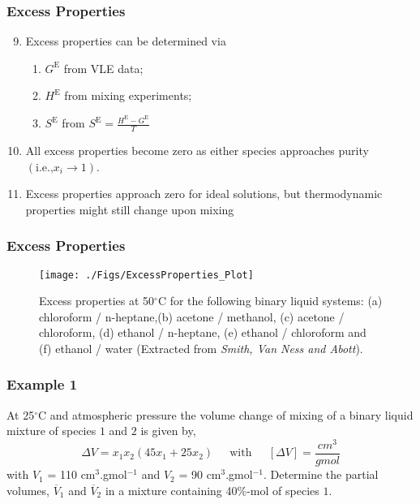 \documentclass[10pt,compress,handout,ignorenonframetext,unknownkeysallowed]{beamer}
\newcommand{\frc}{\displaystyle\frac}
\begin{document}
\begin{frame}
  \frametitle{Excess Properties}
  \begin{enumerate}\setcounter{enumi}{8}
      \item<1-> Excess properties can be determined via
         \begin{enumerate}
            \item<1-> $G^{\text{E}}$ from VLE data;
            \item<1-> $H^{\text{E}}$ from mixing experiments;
            \item<1-> $S^{\text{E}}$ from $S^{\text{E}}=\frc{H^{\text{E}}-G^{\text{E}}}{T}$
         \end{enumerate}
      \item<2-> All excess properties become zero as either species approaches purity $\left(\text{i.e.,} x_{i}\rightarrow 1\right)$.
      \item<3-> Excess properties approach zero for ideal solutions, but thermodynamic properties might still change upon mixing
  \end{enumerate}
\end{frame}
\normalsize

\scriptsize
\begin{frame}
  \frametitle{Excess Properties}
     \begin{center}
       \begin{figure}
         \texttt{[image: ./Figs/ExcessProperties\_Plot]}
          \caption{\scriptsize Excess properties at 50$^{\circ}$C for the following binary liquid systems: (a) chloroform / n-heptane,(b) acetone / methanol, (c) acetone / chloroform, (d) ethanol / n-heptane, (e) ethanol / chloroform and (f) ethanol / water (Extracted from {\it Smith, Van Ness and Abott}). }
       \end{figure}
     \end{center}
\end{frame}
\normalsize

\begin{frame}
  \frametitle{Example 1}
    At 25$^{\circ}$C and atmospheric pressure the volume change of mixing of a binary liquid mixture of species $1$ and $2$ is given by,
    \begin{displaymath}
       \Delta V = x_{1}x_{2}\left(45x_{1}+25x_{2}\right)\;\;\;\;\text{ with }\;\;\;\; \left[\Delta V\right] = \frc{cm^{3}}{gmol}
    \end{displaymath}
    with $V_{1}$ = 110 cm$^{3}$.gmol$^{-1}$ and $V_{2}$ = 90 cm$^{3}$.gmol$^{-1}$. Determine the partial volumes, $\overline{V}_{1}$ and $\overline{V}_{2}$ in a mixture containing 40$\%$-mol of species $1$.
      
\end{frame}
\normalsize
\end{document}

